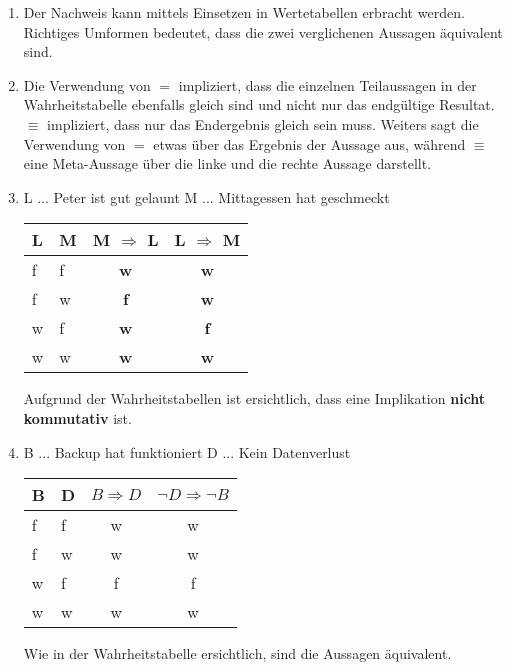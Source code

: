 \documentclass[a4paper]{article}
\begin{document}
\begin{enumerate}
		\item
		Der Nachweis kann mittels Einsetzen in Wertetabellen erbracht werden. Richtiges Umformen bedeutet, dass die zwei verglichenen Aussagen äquivalent sind.
		
		\item
		Die Verwendung von $=$ impliziert, dass die einzelnen Teilaussagen in der Wahrheitstabelle ebenfalls gleich sind und nicht nur das endgültige Resultat. $\equiv$ impliziert, dass nur das Endergebnis gleich sein muss.
		\newline
		Weiters sagt die Verwendung von $=$ etwas über das Ergebnis der Aussage aus, während $\equiv$ eine Meta-Aussage über die linke und die rechte Aussage darstellt.
		
		\item
		L ... Peter ist gut gelaunt
		\newline
		M ... Mittagessen hat geschmeckt
		
		\begin{tabular}{|l|l|c|c|}
			\firsthline
			L & M & M $\Rightarrow$ L & L $\Rightarrow$ M \\
			\hline
			f & f & \textbf{w} & \textbf{w} \\
			f & w & \textbf{f} & \textbf{w} \\
			w & f & \textbf{w} & \textbf{f} \\
			w & w & \textbf{w} & \textbf{w} \\
			\hline
		\end{tabular}
		
		Aufgrund der Wahrheitstabellen ist ersichtlich, dass eine Implikation \textbf{nicht kommutativ} ist.
		
		\item
		B ... Backup hat funktioniert
		\newline
		D ... Kein Datenverlust
		
		\begin{tabular}{|l|l|c|c|}
			\firsthline
			B & D & $B \Rightarrow D$ & $\lnot D \Rightarrow \lnot B$ \\			
			\hline
				f & f & w & w \\
				f & w & w & w \\
				w & f & f & f \\
				w & w & w & w \\
			\hline
		\end{tabular}
		
		Wie in der Wahrheitstabelle ersichtlich, sind die Aussagen äquivalent.
	\end{enumerate}
	
\end{document}

